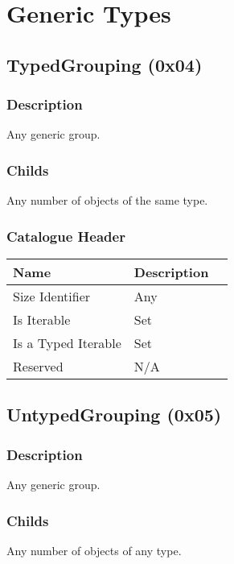 \documentclass[11pt]{article}
\begin{document}
\section{Generic Types}


\subsection{TypedGrouping (0x04)}
\subsubsection{Description}
Any generic group.

\subsubsection{Childs}
Any number of objects of the same type.

\subsubsection{Catalogue Header}

\begin{center}
\begin{tabular}{ |l|l|l| } 
\hline
\textbf{Name} & \textbf{Description}\\
\hline
Size Identifier & Any \\
Is Iterable & Set \\
Is a Typed Iterable & Set \\   
Reserved & N/A \\ 
\hline
\end{tabular}
\end{center}


\subsection{UntypedGrouping (0x05)}
\subsubsection{Description}
Any generic group.

\subsubsection{Childs}
Any number of objects of any type.
\end{document}
